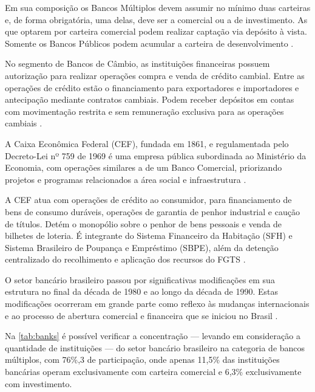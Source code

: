 \documentclass[12pt,openright,oneside,a4paper,chapter=TITLE,section=TITLE,subsection=TITLE,english,french,spanish,portugues,sumario=tradicional]{abntex2}
\begin{document}
Em sua composição os Bancos Múltiplos devem assumir no mínimo duas carteiras e,
de forma obrigatória, uma delas, deve ser a comercial ou a de investimento. As
que optarem por carteira comercial podem realizar captação via depósito à vista. Somente os Bancos Públicos podem acumular a carteira de desenvolvimento
\cite{Res:2099:1994}.

No segmento de Bancos de Câmbio, as instituições financeiras possuem
autorização para realizar operações compra e venda de crédito cambial. Entre as
operações de crédito estão o financiamento para exportadores e importadores e
antecipação mediante contratos cambiais. Podem receber depósitos em contas com
movimentação restrita e sem remuneração exclusiva para as operações cambiais
\cite{Res:3426:2006}.

A Caixa Econômica Federal (CEF), fundada em 1861, e regulamentada pelo
Decreto-Lei nº 759 de 1969 é uma empresa pública subordinada ao Ministério da
Economia, com operações similares a de um Banco Comercial, priorizando projetos
e programas relacionados a área social e infraestrutura \cite{DL:759:1969}.

A CEF atua com operações de crédito ao consumidor, para financiamento de bens
de consumo duráveis, operações de garantia de penhor industrial e caução de
títulos. Detém o monopólio sobre o penhor de bens pessoais e venda de bilhetes
de loteria. É integrante do Sistema Financeiro da Habitação (SFH) e Sistema
Brasileiro de Poupança e Empréstimo (SBPE), além da detenção centralizado do
recolhimento e aplicação dos recursos do FGTS \cite{DL:759:1969}.

O setor bancário brasileiro passou por significativas modificações em sua
estrutura no final da década de 1980 e ao longo da década de 1990. Estas
modificações ocorreram em grande parte como reflexo às mudanças internacionais
e ao processo de abertura comercial e financeira que se iniciou no Brasil
\cite{camargo:2009}.

Na \autoref{tab:banks} é possível verificar a concentração --- levando em
consideração a quantidade de instituições --- do setor bancário brasileiro na
categoria de bancos múltiplos, com 76\%,3 de participação, onde apenas 11,5\% das
instituições bancárias operam exclusivamente com carteira comercial e 6,3\%
exclusivamente com investimento.
\end{document}

